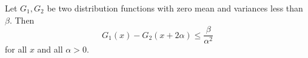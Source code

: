 Let $G_1, G_2$ be two distribution functions with zero mean and variances less than $\beta$. Then
$$G_1(x) - G_2(x + 2\alpha) \leq \frac{\beta}{\alpha^2}$$
for all $x$ and all $\alpha > 0$.
